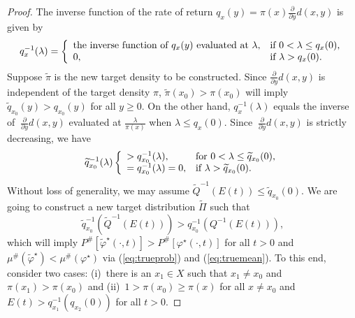 \documentclass[12pt]{article}
\theoremstyle{plain}
\theoremstyle{definition}
\theoremstyle{remark}
\begin{document}
\begin{proof}
The inverse function of the  rate of return $q_x(y)=\pi(x) \frac{\partial}{\partial y}d(x,y)$ is given by
\begin{equation*}
q^{-1}_x(\lambda)=\left\{
		                           \begin{array}{ll}
		                           \text{the inverse function of $q_x(y)$  evaluated at $\lambda$},& \hbox{if $0<\lambda\leq q_x(0)$,} \\
					0, & \hbox{if $\lambda>q_x(0)$.} 
		                          \end{array}
		                         \right.
\end{equation*}	
Suppose $\widetilde{\pi}$ is the new target density to be constructed.  Since $\frac{\partial}{\partial y}d(x, y)$ is independent of the target density $\pi$,  $\widetilde{\pi}(x_0)>\pi(x_0)$ will imply $\widetilde{q}_{x_0}(y)> q_{x_0}(y)$ for all $y\geq 0$.  On the other hand,  $q_x^{-1}(\lambda)$ equals the inverse of $\ \frac{\partial}{\partial y}d(x, y)$ evaluated at $\frac{\lambda}{\pi(x)}$ when $\lambda\leq q_x(0)$.  Since $\ \frac{\partial}{\partial y}d(x, y)$ is strictly decreasing, we have
\begin{equation}
\label{eq:discrete1}
\widetilde{q}^{-1}_{x_0}(\lambda)\left\{
		                           \begin{array}{ll}
		                           >q_{x_0}^{-1}(\lambda),& \hbox{for $0<\lambda\leq \widetilde{q}_{x_0}(0)$,} \\
					=q_{x_0}^{-1}(\lambda)=0, & \hbox{if $\lambda>\widetilde{q}_{x_0}(0)$.} 
		                          \end{array}
		                         \right.
\end{equation}	
Without loss of generality, we may assume $\widetilde{Q}^{-1}(E(t))\leq \widetilde{q}_{x_0}(0)$.
We are going to construct a new target distribution $\widetilde{\Pi}$ such that
\begin{equation}
\label{eq:condition}
\widetilde{q}_{x_0}^{-1}(\widetilde{Q}^{-1}(E(t)))>q_{x_0}^{-1}(Q^{-1}(E(t))),
\end{equation}
which will imply $P^{\#}[\widetilde{\varphi}^\star(\cdot, t)]>P^{\#}[\varphi^\star(\cdot, t)]$ for all $t>0$ and $\mu^{\#}(\widetilde{\varphi}^\star)<\mu^{\#}(\varphi^\star)$ via (\ref{eq:trueprob}) and (\ref{eq:truemean}). To this end,  consider two cases: (i)~there is an $x_1\in X$ such that $x_1\neq x_0$ and $\pi(x_1)>\pi(x_0)$ and (ii)~$1>\pi(x_0)\geq \pi(x)$ for all $x\neq  x_0$ and $E(t)>q_{x_1}^{-1}(q_{x_2}(0))$ for all $t>0$.


\end{proof}
\end{document}
